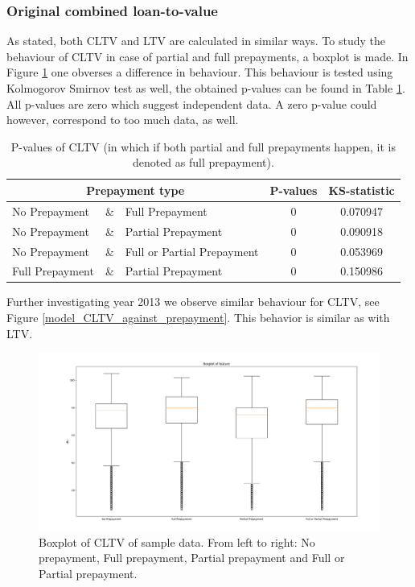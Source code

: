     \subsubsection{Original combined loan-to-value}
        As stated, both CLTV and LTV are calculated in similar ways. To study the behaviour of CLTV in case of partial and full prepayments, a boxplot is made. In Figure \ref{model_boxplot_CLTV} one obverses a difference in behaviour. This behaviour is tested using Kolmogorov Smirnov test as well, the obtained p-values can be found in Table \ref{model_Pvals_of_CLTV}. All p-values are zero which suggest independent data. A zero p-value could however, correspond to too much data, as well.
        \begin{table}[H]
        \centering
            \begin{tabular}{lcl|c|c}
            \multicolumn{3}{c}{Prepayment type} & P-values& KS-statistic \\\hline
            No Prepayment & \& & Full Prepayment & 0 & 0.070947\\
            No Prepayment & \& & Partial Prepayment & 0 & 0.090918\\
            No Prepayment & \& & Full or Partial Prepayment & 0 & 0.053969 \\
            Full Prepayment & \& & Partial Prepayment & 0 & 0.150986
		    \end{tabular}
            \caption{P-values of CLTV (in which if both partial and full prepayments happen, it is denoted as full prepayment).}
	        \label{model_Pvals_of_CLTV}
        \end{table}
        Further investigating year 2013 we observe similar behaviour for CLTV, see Figure \ref{model_CLTV_against_prepayment}. This behavior is similar as with LTV.
        \begin{figure}[H]
            \centering
            \includegraphics[width=\linewidth]{Latex/Report/Figures/Boxplot_of_cltv_[2013, 2014, 2015, 2016, 2017, 2018, 2019, 2020]_.png}
            \caption{Boxplot of CLTV of sample data. From left to right: No prepayment, Full prepayment, Partial prepayment and Full or Partial prepayment.}
            \label{model_boxplot_CLTV}
        \end{figure}
